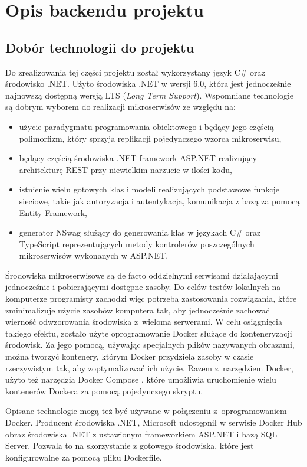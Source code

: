 \documentclass{SGGW-thesis}
\begin{document}
\chapter{Opis backendu projektu}
\section{Dobór technologii do projektu}
Do zrealizowania tej części projektu został wykorzystany język C\# oraz środowisko .NET. Użyto środowiska .NET w wersji 6.0, która jest jednocześnie najnowszą dostępną wersją LTS (\textit{Long Term Support}). Wspomniane technologie są dobrym wyborem do realizacji mikroserwisów ze względu na:

\begin{itemize}
	\item użycie paradygmatu programowania obiektowego i będący jego częścią polimorfizm, który sprzyja replikacji pojedynczego wzorca mikroserwisu,
	\item będący częścią środowiska .NET framework ASP.NET realizujący architekturę REST przy niewielkim narzucie w ilości kodu,
	\item istnienie wielu gotowych klas i modeli realizujących podstawowe funkcje sieciowe, takie jak autoryzacja i autentykacja, komunikacja z bazą za pomocą Entity Framework,
	\item generator NSwag służący do generowania klas w językach C\# oraz TypeScript reprezentujących metody kontrolerów poszczególnych mikroserwisów wykonanych w ASP.NET.
\end{itemize}

Środowiska mikroserwisowe są de facto oddzielnymi serwisami działającymi jednocześnie i pobierającymi dostępne zasoby. Do celów testów lokalnych na komputerze programisty zachodzi więc potrzeba zastosowania rozwiązania, które zminimalizuje użycie zasobów komputera tak, aby jednocześnie zachować wierność odwzorowania środowiska z~wieloma serwerami. W celu osiągnięcia takiego efektu, zostało użyte oprogramowanie Docker służące do konteneryzacji środowisk. Za jego pomocą, używając specjalnych plików nazywanych obrazami, można tworzyć kontenery, którym Docker przydziela zasoby w czasie rzeczywistym tak, aby zoptymalizować ich użycie.
Razem z~narzędziem Docker, użyto też narzędzia Docker Compose \cite{dockercompose}, które umożliwia uruchomienie wielu kontenerów Dockera za pomocą pojedynczego skryptu.

Opisane technologie mogą też być używane w połączeniu z~oprogramowaniem Docker. Producent środowiska .NET, Microsoft udostępnił w serwisie Docker Hub obraz środowiska .NET z ustawionym frameworkiem ASP.NET i bazą SQL Server. Pozwala to na skorzystanie z gotowego środowiska, które jest konfigurowalne za pomocą pliku Dockerfile.
\end{document}
